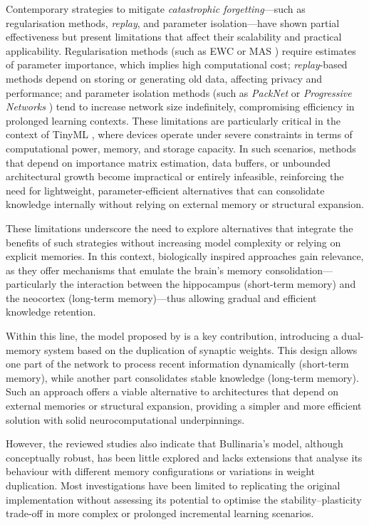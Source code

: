Contemporary strategies to mitigate \textit{catastrophic forgetting}---such as 
regularisation methods, \textit{replay}, and parameter isolation---have shown partial 
effectiveness but present limitations that affect their scalability and practical 
applicability. Regularisation methods (such as EWC \cite{kirkpatrick2017overcoming} or 
MAS \cite{aljundi2018mas}) require estimates of parameter importance, which implies high 
computational cost; \textit{replay}-based methods \cite{rebuffi2017icarl, 
rolnick2019experience} depend on storing or generating old data, affecting privacy and 
performance; and parameter isolation methods (such as \textit{PackNet} 
\cite{mallya2018packnet} or \textit{Progressive Networks} \cite{rusu2016pnn}) tend to 
increase network size indefinitely, compromising efficiency in prolonged learning 
contexts. These limitations are particularly critical in the context of TinyML 
\cite{warden2019tinyml}, where devices operate under severe constraints in terms of 
computational power, memory, and storage capacity. In such scenarios, methods that depend 
on importance matrix estimation, data buffers, or unbounded architectural growth become 
impractical or entirely infeasible, reinforcing the need for lightweight, 
parameter-efficient alternatives that can consolidate knowledge internally without 
relying on external memory or structural expansion. 

These limitations underscore the need to explore alternatives that integrate the benefits of such strategies without increasing model complexity or relying on explicit memories. 
In this context, biologically inspired approaches gain relevance, as they offer mechanisms that emulate the brain's memory consolidation—particularly the interaction between the hippocampus (short-term memory) and the neocortex (long-term memory)—thus allowing gradual and efficient knowledge retention.  

Within this line, the model proposed by \cite{bullinaria2009} is a key contribution, introducing a dual-memory system based on the duplication of synaptic weights. 
This design allows one part of the network to process recent information dynamically (short-term memory), while another part consolidates stable knowledge (long-term memory). 
Such an approach offers a viable alternative to architectures that depend on external memories or structural expansion, providing a simpler and more efficient solution with solid neurocomputational underpinnings.

However, the reviewed studies also indicate that Bullinaria’s model, although conceptually robust, has been little explored and lacks extensions that analyse its behaviour with different memory configurations or variations in weight duplication. 
Most investigations have been limited to replicating the original implementation without assessing its potential to optimise the stability–plasticity trade-off in more complex or prolonged incremental learning scenarios.

